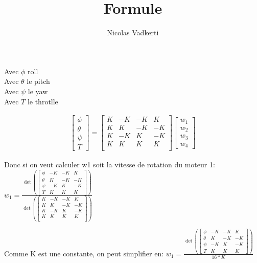 \documentclass[10pt,a4paper]{article}
\title{Formule}
\author{Nicolas Vadkerti}
\begin{document}
\maketitle
Avec $\phi$ roll\\
Avec $\theta$ le pitch\\
Avec $\psi $ le yaw \\
Avec $T$ le throtlle

 \begin{equation}\label{xx}
\begin{split}
%  
\begin{bmatrix}
   \phi \\
   \theta \\
   \psi \\
   T
\end{bmatrix}
=
\begin{bmatrix}
    K & -K & -K & K \\
    K & K & -K & -K \\
    K & -K & K & -K \\
    K & K & K & K \\
\end{bmatrix}
 \begin{bmatrix}
    w_1 \\
    w_2 \\
    w_3 \\
    w_4
\end{bmatrix}
\end{split}
\end{equation}

Donc si on veut calculer w1 soit la vitesse de rotation du moteur 1:\\

$w_1 =\frac{ \det(\begin{bmatrix}
            \phi & -K & -K & K\\
            \theta & K & -K & -K\\
            \psi & -K & K & -K\\
            T & K & K & K
          \end{bmatrix})}{\det(\begin{bmatrix}
                K & -K & -K & K \\
                K & K & -K & -K \\
                K & -K & K & -K \\
                K & K & K & K \\
          \end{bmatrix})}$

Comme K est une constante, on peut simplifier en:
$w_1 =\frac{ \det(\begin{bmatrix}
            \phi & -K & -K & K\\
            \theta & K & -K & -K\\
            \psi & -K & K & -K\\
            T & K & K & K
          \end{bmatrix})}{16 * K}$




 
\end{document}
